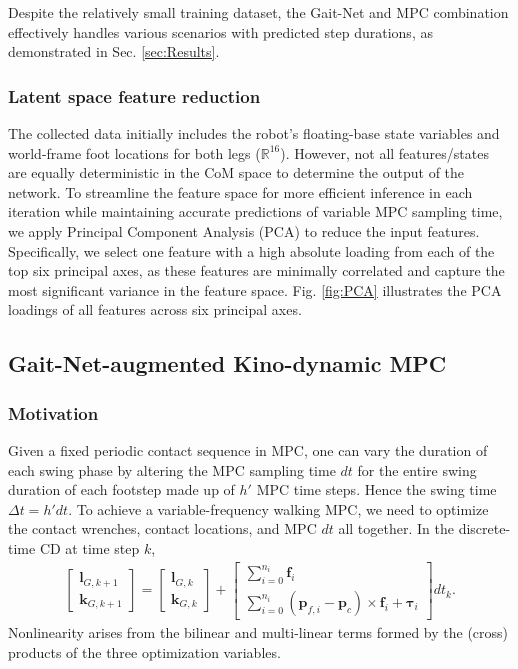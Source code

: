 Despite the relatively small training dataset, the Gait-Net and MPC combination effectively handles various scenarios with predicted step durations, as demonstrated in Sec. \ref{sec:Results}.

\subsubsection{Latent space feature reduction}
The collected data initially includes the robot's floating-base state variables and world-frame foot locations for both legs ($\mathbb R^{16}$). However, not all features/states are equally deterministic in the CoM space to determine the output of the network. To streamline the feature space for more efficient inference in each iteration while maintaining accurate predictions of variable MPC sampling time, we apply Principal Component Analysis (PCA) to reduce the input features. Specifically, we select one feature with a high absolute loading from each of the top six principal axes, as these features are minimally correlated and capture the most significant variance in the feature space. Fig.  \ref{fig:PCA} illustrates the PCA loadings of all features across six principal axes.

\subsection{Gait-Net-augmented Kino-dynamic MPC}
\label{subsec:gaitnetmpc}

\subsubsection{Motivation}
Given a fixed periodic contact sequence in MPC, one can vary the duration of each swing phase by altering the MPC sampling time $dt$ for the entire swing duration of each footstep made up of $h'$ MPC time steps. Hence the swing time $\Delta t = h'dt$. To achieve a variable-frequency walking MPC, we need to optimize the contact wrenches, contact locations, and MPC $dt$ all together.
In the discrete-time CD at time step $k$, 
\begin{equation}
\begin{aligned}
\label{eq:cd_discrete}
    \begin{bmatrix}
        \bm l_{G,k+1} \\ \bm k_{G,k+1}
    \end{bmatrix}
     = \begin{bmatrix}
        \bm l_{G,k} \\ \bm k_{G,k}
    \end{bmatrix} +
    \left[\begin{array}{c} 
    \sum_{i = 0}^{n_i}\bm f_i \\
    \sum_{i = 0}^{n_i}(\bm p_{f,i}-\bm p_c) \times \bm f_i + \bm \tau_i
    \end{array} \right]dt_k.
\end{aligned}
\end{equation}
Nonlinearity arises from the bilinear and multi-linear terms formed by the (cross) products of the three optimization variables.

